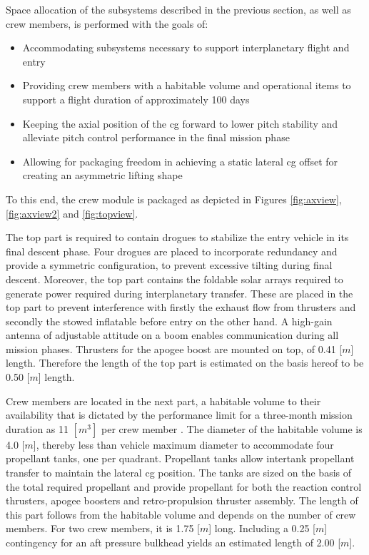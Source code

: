 Space allocation of the subsystems described in the previous section, as well as crew members, is performed with the goals of:
\begin{itemize}
\item Accommodating subsystems necessary to support interplanetary flight and entry
\item Providing crew members with a habitable volume and operational items to support a flight duration of approximately 100 days
\item Keeping the axial position of the \gls{cg} forward to lower pitch stability and alleviate pitch control performance in the final mission phase
\item Allowing for packaging freedom in achieving a static lateral \gls{cg} offset for creating an asymmetric lifting shape
\end{itemize}
To this end, the crew module is packaged as depicted in Figures \ref{fig:axview}, \ref{fig:axview2} and \ref{fig:topview}. 

The top part is required to contain drogues to stabilize the entry vehicle in its final descent phase. Four drogues are placed to incorporate redundancy and provide
a symmetric configuration, to prevent excessive tilting during final descent. Moreover, the top part contains the foldable solar arrays required to generate power required during interplanetary transfer. These are placed in the top part to prevent interference with firstly the exhaust flow from thrusters and secondly the stowed inflatable before entry on the other hand. A high-gain antenna of adjustable attitude on a boom enables communication during all mission phases. Thrusters for the apogee boost are mounted on top, of 0.41 [$m$] length. Therefore the length of the top part is estimated on the basis hereof to be 0.50 [$m$] length.

Crew members are located in the next part, a habitable volume to their availability that is dictated by the performance limit for a three-month mission duration as 11 $[m^{3}]$ per crew member \cite{Rudisill2008}. The diameter of the habitable volume is 4.0 [$m$], thereby less than vehicle maximum diameter to accommodate four propellant tanks, one per quadrant. Propellant tanks allow intertank propellant transfer to maintain the lateral \gls{cg} position. The tanks are sized on the basis of the total required propellant and provide propellant for both the reaction control thrusters, apogee boosters and retro-propulsion thruster assembly. The length of this part follows from the habitable volume and depends on the number of crew members. For two crew members, it is 1.75 [$m$] long. Including a 0.25 [$m$] contingency for an aft pressure bulkhead yields an estimated length of 2.00 [$m$].

